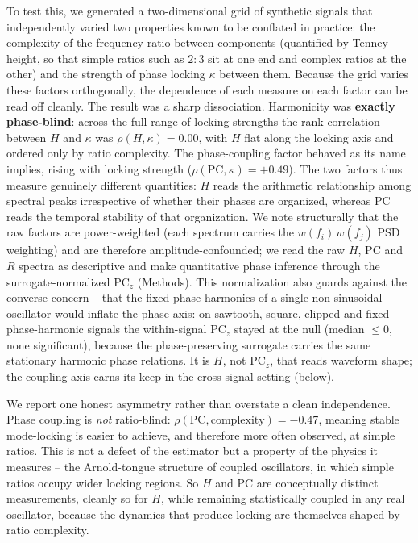 \documentclass[11pt]{article}
\begin{document}
To test this, we generated a two-dimensional grid of synthetic signals that independently varied two properties known to be conflated in practice: the complexity of the frequency ratio between components (quantified by Tenney height, so that simple ratios such as $2{:}3$ sit at one end and complex ratios at the other) and the strength of phase locking $\kappa$ between them. Because the grid varies these factors orthogonally, the dependence of each measure on each factor can be read off cleanly. The result was a sharp dissociation. Harmonicity was \textbf{exactly phase-blind}: across the full range of locking strengths the rank correlation between $H$ and $\kappa$ was $\rho(H,\kappa)=\mathbf{0.00}$, with $H$ flat along the locking axis and ordered only by ratio complexity. The phase-coupling factor behaved as its name implies, rising with locking strength ($\rho(\mathrm{PC},\kappa)=+0.49$). The two factors thus measure genuinely different quantities: $H$ reads the arithmetic relationship among spectral peaks irrespective of whether their phases are organized, whereas $\mathrm{PC}$ reads the temporal stability of that organization. We note structurally that the raw factors are power-weighted (each spectrum carries the $w(f_i)\,w(f_j)$ PSD weighting) and are therefore amplitude-confounded; we read the raw $H$, $\mathrm{PC}$ and $R$ spectra as descriptive and make quantitative phase inference through the surrogate-normalized $\mathrm{PC}_z$ (Methods). This normalization also guards against the converse concern -- that the fixed-phase harmonics of a single non-sinusoidal oscillator would inflate the phase axis: on sawtooth, square, clipped and fixed-phase-harmonic signals the within-signal $\mathrm{PC}_z$ stayed at the null (median $\le0$, none significant), because the phase-preserving surrogate carries the same stationary harmonic phase relations. It is $H$, not $\mathrm{PC}_z$, that reads waveform shape; the coupling axis earns its keep in the cross-signal setting (below).

We report one honest asymmetry rather than overstate a clean independence. Phase coupling is \emph{not} ratio-blind: $\rho(\mathrm{PC},\mathrm{complexity})=-0.47$, meaning stable mode-locking is easier to achieve, and therefore more often observed, at simple ratios. This is not a defect of the estimator but a property of the physics it measures -- the Arnold-tongue structure of coupled oscillators, in which simple ratios occupy wider locking regions. So $H$ and $\mathrm{PC}$ are conceptually distinct measurements, cleanly so for $H$, while remaining statistically coupled in any real oscillator, because the dynamics that produce locking are themselves shaped by ratio complexity.
\end{document}
